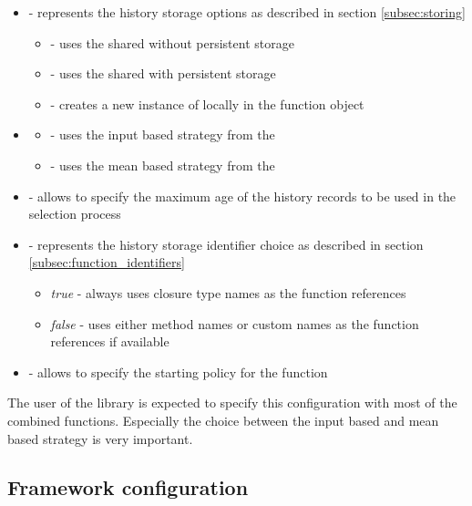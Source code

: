 \begin{itemize}
	\item {} - represents the history storage options as described in section \ref{subsec:storing}
	\begin{itemize}
		\item {} - uses the shared  without persistent storage
		\item {} - uses the shared  with persistent storage
		\item {} - creates a new instance of  locally in the function object
	\end{itemize}
\item {}
\begin{itemize}
	\item {} - uses the input based strategy from the 
	\item {} - uses the mean based strategy from the 
\end{itemize}
\item {} - allows to specify the maximum age of the history records to be used in the selection process
\item {} - represents the history storage identifier choice as described in section \ref{subsec:function_identifiers}
\begin{itemize}
	\item \textit{true} - always uses closure type names as the function references
	\item \textit{false} - uses either method names or custom names as the function references if available
\end{itemize}
\item {} - allows to specify the starting policy for the function
\end{itemize}

The user of the library is expected to specify this configuration with most of the combined functions. Especially the choice between the input based and mean based strategy is very important.

\subsection{Framework configuration}
\label{subsec:framework_config}

